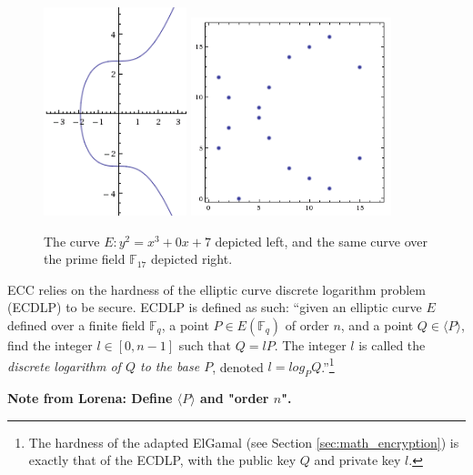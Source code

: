 \begin{figure}[htb]
	\centering
	\includegraphics[width=0.37\textwidth]{introduction/secp256k1-graph}
	\includegraphics[width=0.52\textwidth]{introduction/secp256k1-graph-over-field-p17}
	\caption{The curve \(E: y^2 = x^3 + 0x + 7\) depicted left, and the same curve over the prime field
		\(\mathbb{F}_{17}\) depicted right.}
	\label{fig:graphs}
\end{figure}

ECC relies on the hardness of the elliptic curve discrete logarithm problem (ECDLP) to be secure. ECDLP is
defined as such: ``given an elliptic curve \(E\) defined over a finite field \(\mathbb{F}_q\), a point
\(P \in E(\mathbb{F}_q)\) of order \(n\), and a point \(Q \in \langle P \rangle\), find the integer
\(l \in [0,n-1]\) such that \(Q = lP\). The integer \(l\) is called the \emph{discrete logarithm of
\(Q\) to the base \(P\)}, denoted \(l = log_P Q\).''\footnote{The hardness of the adapted ElGamal (see
Section \ref{sec:math_encryption}) is exactly that of the ECDLP, with the public key \(Q\) and private
key \(l\).}\cite{hankerson2010}

\textbf{Note from Lorena: Define \(\langle P \rangle\) and "order \(n\)".}

